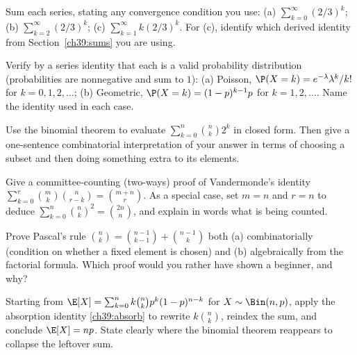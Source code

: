 \begin{exercise}
Sum each series, stating any convergence condition you use:
(a) $\sum_{k=0}^{\infty}(2/3)^k$;\;
(b) $\sum_{k=2}^{\infty}(2/3)^k$;\;
(c) $\sum_{k=1}^{\infty}k(2/3)^{k}$.
For (c), identify which derived identity from Section~\ref{ch39:sums} you are
using.
\end{exercise}

\begin{exercise}
Verify by a series identity that each is a valid probability distribution
(probabilities are nonnegative and sum to $1$):
(a) Poisson, $\P(X=k)=e^{-\lambda}\lambda^k/k!$ for $k=0,1,2,\dots$;\;
(b) Geometric, $\P(X=k)=(1-p)^{k-1}p$ for $k=1,2,\dots$. Name the identity
used in each case.
\end{exercise}

\begin{exercise}
Use the binomial theorem to evaluate $\sum_{k=0}^{n}\binom{n}{k}2^{k}$ in
closed form. Then give a one-sentence combinatorial interpretation of your
answer in terms of choosing a subset and then doing something extra to its
elements.
\end{exercise}

\begin{exercise}
Give a committee-counting (two-ways) proof of Vandermonde's identity
$\sum_{k=0}^{r}\binom{m}{k}\binom{n}{r-k}=\binom{m+n}{r}$. As a special case,
set $m=n$ and $r=n$ to deduce $\sum_{k=0}^{n}\binom{n}{k}^2 = \binom{2n}{n}$,
and explain in words what is being counted.
\end{exercise}

\begin{exercise}
Prove Pascal's rule $\binom{n}{k}=\binom{n-1}{k-1}+\binom{n-1}{k}$ both
(a) combinatorially (condition on whether a fixed element is chosen) and
(b) algebraically from the factorial formula. Which proof would you rather
have shown a beginner, and why?
\end{exercise}

\begin{exercise}
Starting from $\E[X]=\sum_{k=0}^{n}k\binom{n}{k}p^k(1-p)^{n-k}$ for
$X\sim\Bin(n,p)$, apply the absorption identity \eqref{ch39:absorb} to rewrite
$k\binom{n}{k}$, reindex the sum, and conclude $\E[X]=np$. State clearly where
the binomial theorem reappears to collapse the leftover sum.
\end{exercise}

